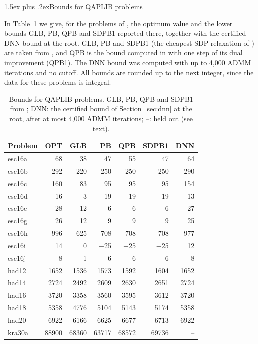 \documentclass[10pt]{article}
\makeatletter
\renewcommand\subsection{\@startsection{subsection}{2}{\z@}{-3.25ex plus -1ex minus -.2ex}%
  {1.5ex plus .2ex}{\normalfont\normalsize\bfseries}}
\theoremstyle{remark}
\makeatother
\begin{document}
\subsection{Bounds for QAPLIB problems}

In Table~\ref{tab:bounds} we give, for the problems of \cite[Table~1]{ab01}, the
optimum value and the lower bounds GLB, PB, QPB and SDPB1 reported there, together
with the certified DNN bound at the root. GLB, PB and SDPB1 (the cheapest SDP
relaxation of \cite{zkrw}) are taken from \cite{zkrw}, and QPB is the bound
computed in \cite{ab01} with one step of its dual improvement (QPB1). The DNN bound
was computed with up to 4,000 ADMM iterations and no cutoff. All bounds are rounded
up to the next integer, since the data for these problems is integral.

\begin{table}[p]\centering
\caption{Bounds for QAPLIB problems. GLB, PB, QPB and SDPB1 from
\cite[Table~1]{ab01}; DNN: the certified bound of Section~\ref{sec:dnn} at the
root, after at most 4,000 ADMM iterations; --: held out (see text).}\label{tab:bounds}
\small
\begin{tabular}{lrrrrrr}
\toprule
Problem & OPT & GLB & PB & QPB & SDPB1 & DNN\\
\midrule
esc16a & 68 & 38 & 47 & 55 & 47 & 64\\
esc16b & 292 & 220 & 250 & 250 & 250 & 290\\
esc16c & 160 & 83 & 95 & 95 & 95 & 154\\
esc16d & 16 & 3 & $-$19 & $-$19 & $-$19 & 13\\
esc16e & 28 & 12 & 6 & 6 & 6 & 27\\
esc16g & 26 & 12 & 9 & 9 & 9 & 25\\
esc16h & 996 & 625 & 708 & 708 & 708 & 977\\
esc16i & 14 & 0 & $-$25 & $-$25 & $-$25 & 12\\
esc16j & 8 & 1 & $-$6 & $-$6 & $-$6 & 8\\
\midrule
had12 & 1652 & 1536 & 1573 & 1592 & 1604 & 1652\\
had14 & 2724 & 2492 & 2609 & 2630 & 2651 & 2724\\
had16 & 3720 & 3358 & 3560 & 3595 & 3612 & 3720\\
had18 & 5358 & 4776 & 5104 & 5143 & 5174 & 5358\\
had20 & 6922 & 6166 & 6625 & 6677 & 6713 & 6922\\
\midrule
kra30a & 88900 & 68360 & 63717 & 68572 & 69736 & --\\

\end{tabular}
\end{table}
\end{document}
